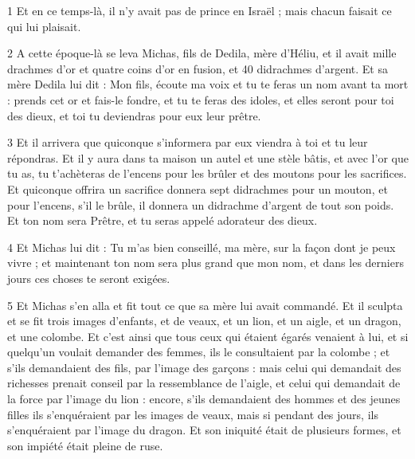 
\par 1 Et en ce temps-là, il n'y avait pas de prince en Israël ; mais chacun faisait ce qui lui plaisait.

\par 2 A cette époque-là se leva Michas, fils de Dedila, mère d'Héliu, et il avait mille drachmes d'or et quatre coins d'or en fusion, et 40 didrachmes d'argent. Et sa mère Dedila lui dit : Mon fils, écoute ma voix et tu te feras un nom avant ta mort : prends cet or et fais-le fondre, et tu te feras des idoles, et elles seront pour toi des dieux, et toi tu deviendras pour eux leur prêtre.

\par 3 Et il arrivera que quiconque s'informera par eux viendra à toi et tu leur répondras. Et il y aura dans ta maison un autel et une stèle bâtis, et avec l'or que tu as, tu t'achèteras de l'encens pour les brûler et des moutons pour les sacrifices. Et quiconque offrira un sacrifice donnera sept didrachmes pour un mouton, et pour l'encens, s'il le brûle, il donnera un didrachme d'argent de tout son poids. Et ton nom sera Prêtre, et tu seras appelé adorateur des dieux.

\par 4 Et Michas lui dit : Tu m'as bien conseillé, ma mère, sur la façon dont je peux vivre ; et maintenant ton nom sera plus grand que mon nom, et dans les derniers jours ces choses te seront exigées.

\par 5 Et Michas s'en alla et fit tout ce que sa mère lui avait commandé. Et il sculpta et se fit trois images d'enfants, et de veaux, et un lion, et un aigle, et un dragon, et une colombe. Et c'est ainsi que tous ceux qui étaient égarés venaient à lui, et si quelqu'un voulait demander des femmes, ils le consultaient par la colombe ; et s'ils demandaient des fils, par l'image des garçons : mais celui qui demandait des richesses prenait conseil par la ressemblance de l'aigle, et celui qui demandait de la force par l'image du lion : encore, s'ils demandaient des hommes et des jeunes filles ils s'enquéraient par les images de veaux, mais si pendant des jours, ils s'enquéraient par l'image du dragon. Et son iniquité était de plusieurs formes, et son impiété était pleine de ruse.

